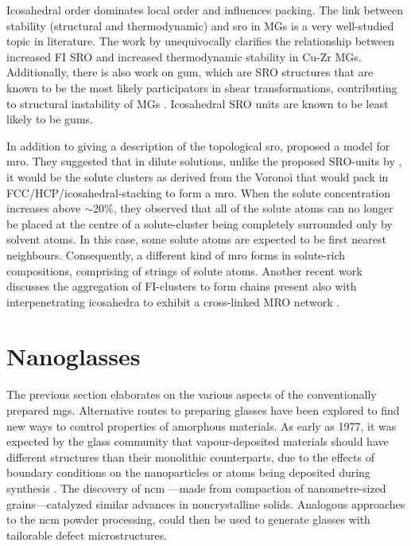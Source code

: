 Icosahedral order dominates local order and influences packing. The link between stability (structural and thermodynamic) and \gls{sro} in MGs is a very well-studied topic in literature. The work by \textcite{Cheng2008} unequivocally clarifies the relationship between increased FI SRO and increased thermodynamic stability in Cu-Zr MGs. Additionally, there is also work on \gls{gum}, which are SRO structures that are known to be the most likely participators in shear transformations, contributing to structural instability of MGs \cite{Ding2014}. Icosahedral SRO units are known to be least likely to be \gls{gum}s. \par

In addition to giving a description of the topological \gls{sro}, \textcite{Sheng2006} proposed a model for \gls{mro}. They suggested that in dilute solutions, unlike the proposed SRO-units by \textcite{Miracle2004}, it would be the solute clusters as derived from the Voronoi that would pack in FCC/HCP/icosahedral-stacking to form a \gls{mro}. When the solute concentration increases above $\sim$20\%, they observed that all of the solute atoms can no longer be placed at the centre of a solute-cluster being completely surrounded only by solvent atoms. In this case, some solute atoms are expected to be first nearest neighbours. Consequently, a different kind of \gls{mro} forms in solute-rich compositions, comprising of  strings of solute atoms. Another recent work discusses the aggregation of FI-clusters to form chains present also with interpenetrating icosahedra to exhibit a cross-linked MRO network \cite{Lee2011,Ritter2012b,Ritter2012}.

\section{Nanoglasses} \label{s:ngs}
The previous section elaborates on the various aspects of the conventionally prepared \gls{mg}s. Alternative routes to preparing glasses have been explored to find new ways to control properties of amorphous materials. As early as 1977, it was expected by the glass community that vapour-deposited materials should have different structures than their monolithic counterparts, due to the effects of boundary conditions on the nanoparticles or atoms being deposited during synthesis \cite{Finney1977}. The discovery of \gls{ncm} \cite{Gleiter1991}---made from compaction of nanometre-sized grains---catalyzed similar advances in 
noncrystalline solids.  Analogous approaches to the \gls{ncm} powder processing, could then be used to generate glasses with tailorable defect microstructures. \par

